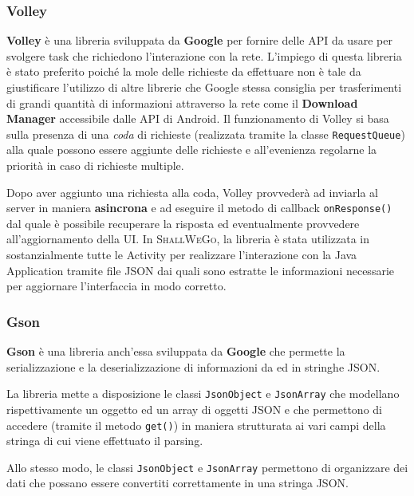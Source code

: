                 \subsubsection{Volley}
                    \textbf{Volley} è una libreria sviluppata da \textbf{Google} per fornire delle API da usare per svolgere task che richiedono l'interazione con la rete. L'impiego di questa libreria è stato preferito poiché la mole delle richieste da effettuare non è tale da giustificare l'utilizzo di altre librerie che Google stessa consiglia per trasferimenti di grandi quantità di informazioni attraverso la rete come il \textbf{Download Manager} accessibile dalle API di Android. Il funzionamento di Volley si basa sulla presenza di una \textit{coda} di richieste (realizzata tramite la classe \texttt{RequestQueue}) alla quale possono essere aggiunte delle richieste e all'evenienza regolarne la priorità in caso di richieste multiple.

                    Dopo aver aggiunto una richiesta alla coda, Volley provvederà ad inviarla al server in maniera \textbf{asincrona} e ad eseguire il metodo di callback \texttt{onResponse()} dal quale è possibile recuperare la risposta ed eventualmente provvedere all'aggiornamento della UI. In \textsc{ShallWeGo}, la libreria è stata utilizzata in sostanzialmente tutte le Activity per realizzare l'interazione con la Java Application tramite file JSON dai quali sono estratte le informazioni necessarie per aggiornare l'interfaccia in modo corretto.
                
                \subsubsection{Gson}
                    \textbf{Gson} è una libreria anch'essa sviluppata da \textbf{Google} che permette la serializzazione e la deserializzazione di informazioni da ed in stringhe JSON.
                    
                    La libreria mette a disposizione le classi \texttt{JsonObject} e \texttt{JsonArray} che modellano rispettivamente un oggetto ed un array di oggetti JSON e che permettono di accedere (tramite il metodo \texttt{get()}) in maniera strutturata ai vari campi della stringa di cui viene effettuato il parsing.
                    
                    Allo stesso modo, le classi \texttt{JsonObject} e \texttt{JsonArray} permettono di organizzare dei dati che possano essere convertiti correttamente in una stringa JSON.
                    
